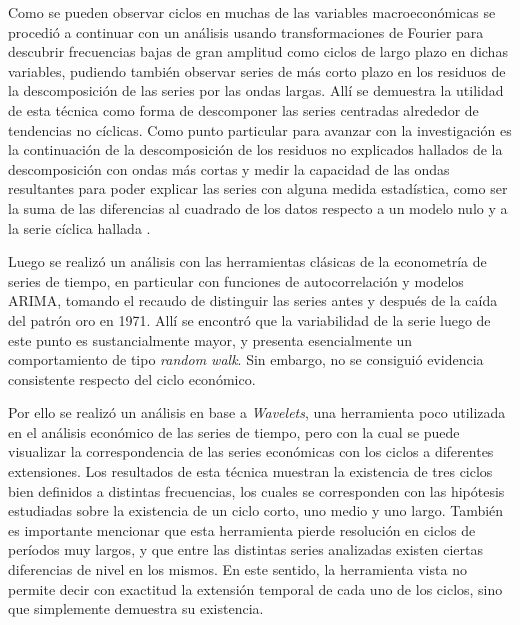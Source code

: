 \documentclass[a4paper]{article}
\begin{document}
Como se pueden observar ciclos en muchas de las variables macroeconómicas se procedió a continuar con un análisis usando transformaciones de Fourier para descubrir frecuencias bajas de gran amplitud como ciclos de largo plazo en dichas variables, pudiendo también observar series de más corto plazo en los residuos de la descomposición de las series por las ondas largas. Allí se demuestra la utilidad de esta técnica como forma de descomponer las series centradas alrededor de tendencias no cíclicas. Como punto particular para avanzar con la investigación es la continuación de la descomposición de los residuos no explicados hallados de la descomposición con ondas más cortas y medir la capacidad de las ondas resultantes para poder explicar las series con alguna medida estadística, como ser la suma de las diferencias al cuadrado de los datos respecto a un modelo nulo y a la serie cíclica hallada	.

Luego se realizó un análisis con las herramientas clásicas de la econometría de series de tiempo, en particular con funciones de autocorrelación y modelos ARIMA, tomando el recaudo de distinguir las series antes y después de la caída del patrón oro en 1971. Allí se encontró que la variabilidad de la serie luego de este punto es sustancialmente mayor, y presenta esencialmente un comportamiento de tipo \textit{random walk}. Sin embargo, no se consiguió evidencia consistente respecto del ciclo económico.

Por ello se realizó un análisis en base a \textit{Wavelets}, una herramienta poco utilizada en el análisis económico de las series de tiempo, pero con la cual se puede visualizar la correspondencia de las series económicas con los ciclos a diferentes extensiones. Los resultados de esta técnica muestran la existencia de tres ciclos bien definidos a distintas frecuencias, los cuales se corresponden con las hipótesis estudiadas sobre la existencia de un ciclo corto, uno medio y uno largo. También es importante mencionar que esta herramienta pierde resolución en ciclos de períodos muy largos, y que entre las distintas series analizadas existen ciertas diferencias de nivel en los mismos. En este sentido, la herramienta vista no permite decir con exactitud la extensión temporal de cada uno de los ciclos, sino que simplemente demuestra su existencia.
\end{document}
